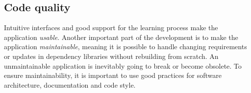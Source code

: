 \subsection{Code quality}

Intuitive interfaces and good support for the learning process make the application \emph{usable}. Another important part of the development is to make the application \emph{maintainable}, meaning it is possible to handle changing requirements or updates in dependency libraries without rebuilding from scratch. An unmaintainable application is inevitably going to break or become obsolete. To ensure maintainability, it is important to use good practices for software architecture, documentation and code style.